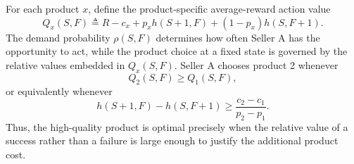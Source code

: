 \documentclass[opre]{informs3}
\newcommand{\Natu}{\mathbb{N}}
\newcommand{\State}{\mathcal{S}}
\begin{document}
For each product $x$, define the product-specific average-reward action value
\begin{equation}
    Q_x(S,F)
    \triangleq
    R-c_x
    +p_xh(S+1,F)
    +(1-p_x)h(S,F+1).
    \label{eq:average-action-value}
\end{equation}
The demand probability $\rho(S,F)$ determines how often Seller A has the
opportunity to act, while the product choice at a fixed state is governed by the
relative values embedded in $Q_x(S,F)$. Seller A chooses product 2 whenever
\begin{equation}
    Q_2(S,F)\geq Q_1(S,F),
\end{equation}
or equivalently whenever
\begin{equation}
    h(S+1,F)-h(S,F+1)
    \geq
    \frac{c_2-c_1}{p_2-p_1}.
    \label{eq:average-threshold}
\end{equation}
Thus, the high-quality product is optimal precisely when the relative value of a
success rather than a failure is large enough to justify the additional product
cost.


\end{document}
